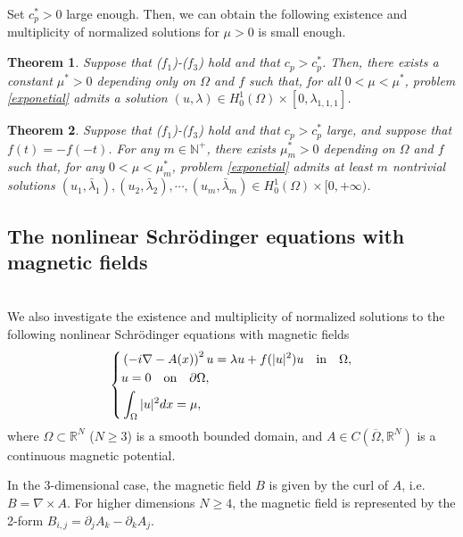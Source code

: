 \documentclass[11pt]{amsart}
\newtheorem{theorem}{Theorem}[section]
\numberwithin{equation}{section}
\begin{document}
Set $c_p^*>0$ large enough. Then, we can obtain the following existence and multiplicity of normalized solutions for $\mu>0$ is small enough.
\begin{theorem}
Suppose that ($f_1$)-($f_3$) hold and that $c_p>c_p^*$. Then, there exists a constant $\mu^{*}>0$ depending only on $\Omega$ and $f$ such that, for all $0<\mu<\mu^{*}$, problem \eqref{exponetial} admits a solution $(u,\lambda) \in H^1_0(\Omega) \times  [0, {\lambda}_{1,1,1}]$.
\end{theorem}
\begin{theorem}
Suppose that ($f_1$)-($f_3$) hold and that $c_p>c_p^*$ large, and suppose that $f(t)=-f(-t)$. For any $m \in \mathbb{N}^+$, there exists $\mu^{*}_{m} > 0$ depending on $\Omega$ and $f$ such that, for any $0 < \mu < \mu^{*}_{m}$, problem \eqref{exponetial}  admits at least $m$ nontrivial solutions $(u_1,\bar{\lambda}_1), (u_2,\bar{\lambda}_2),\cdots,(u_m,\bar{\lambda}_m) \in H_0^{1}(\Omega)\times[0,+\infty)$.
\end{theorem}
\subsection{The nonlinear Schr\"{o}dinger equations with magnetic fields} \mbox{}\\
We also investigate the existence and multiplicity of normalized solutions to the following nonlinear Schr\"{o}dinger equations with magnetic fields
\begin{equation} \label{P5}
	\left\{
	\begin{aligned}
		&\left( -i \nabla -A(x)\right)^2u =\lambda u+f(|u|^2)u \quad  \hbox{in} \quad \Omega,\\
		& u=0 \quad  \hbox{on} \quad \partial \Omega,\\
		&\int_{\Omega}|u|^{2}dx=\mu,
	\end{aligned}
	\right.
\end{equation}
where $\Omega \subset \mathbb{R}^N$ ($N \geq 3$)  is a smooth bounded domain,   and $A\in C(\overline{\Omega}, \mathbb{R}^N)$ is a continuous magnetic potential.

In the  $3$-dimensional case, the magnetic field $B$  is given by the curl of $A$, i.e. $B=\nabla \times A$. For higher dimensions $N \geq 4$, the magnetic field is represented by the 2-form $B_{i,j} = \partial_j A_k - \partial_k A_j$.
\end{document}
